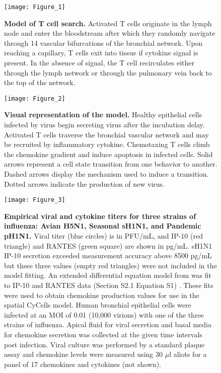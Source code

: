 \documentclass[10pt]{article}
\begin{document}
\begin{figure}[!ht]
\begin{center}
\texttt{[image: Figure\_1]}
\end{center}
\caption{{\bf Model of T cell search.}  Activated T cells originate in the lymph node and enter the bloodstream after which they randomly navigate through 14 vascular bifurcations of the bronchial network.  Upon reaching a capillary, T cells exit into tissue if cytokine signal is present.  In the absence of signal, the T cell recirculates either through the lymph network or through the pulmonary vein back to the top of the network.}
\label{fig:systemchart}
\end{figure}

\begin{figure}[!ht]
\begin{center}
\texttt{[image: Figure\_2]}
\end{center}
\caption{{\bf Visual representation of the model.}  Healthy epithelial cells infected by virus begin secreting virus after the incubation delay.  Activated T cells traverse the bronchial vascular network and may be recruited by inflammatory cytokine.  Chemotaxing T cells climb the chemokine gradient and induce apoptosis in infected cells.  Solid arrows represent a cell state transition from one behavior to another.  Dashed arrows display the mechanism used to induce a transition.  Dotted arrows indicate the production of new virus.}
\label{fig:modelchart}
\end{figure}

\begin{figure}[!ht]
\begin{center}
 \texttt{[image: Figure\_3]}
 \end{center}
\caption{{\bf Empirical viral and cytokine titers for three strains of influenza: Avian H5N1, Seasonal sH1N1, and Pandemic pH1N1.}  Viral titer (blue circles) is in PFU/mL, and IP-10 (red triangle) and RANTES (green square) are shown in pg/mL.   sH1N1 IP-10 secretion exceeded measurement accuracy above 8500 pg/mL but these three values (empty red triangles) were not included in the model fitting.  An extended differential equation model from \cite{Mitchell2011} was fit to IP-10 and RANTES data (Section S2.1 Equation S1) .  These fits were used to obtain chemokine production values for use in the spatial CyCells model.  Human bronchial epithelial cells were infected at an MOI of 0.01 (10,000 virions) with one of the three strains of influenza.  Apical fluid for viral secretion and basal media for chemokine secretion was collected at the given time intervals post infection.  Viral culture was performed by a standard plaque assay and chemokine levels were measured using 30 $\mu$l aliots for a panel of 17 chemokines and cytokines (not shown).} 
 \label{fig:data}
\end{figure}
\end{document}
